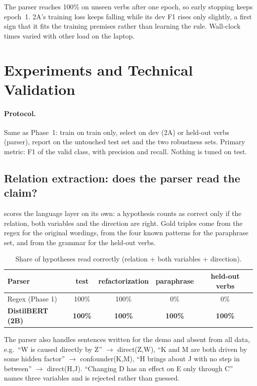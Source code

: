 \documentclass[12pt,a4paper]{article}
\newcommand{\thead}[1]{\textbf{#1}}
\begin{document}
The parser reaches 100\% on unseen verbs after one epoch, so early stopping keeps epoch~1. 2A's training loss keeps
falling while its dev F1 rises only slightly, a first sign that it fits the training premises rather than learning the rule.
Wall-clock times varied with other load on the laptop.

\section{Experiments and Technical Validation}\label{sec:results}

\paragraph{Protocol.} Same as Phase~1: train on train only, select on dev (2A) or held-out verbs (parser), report on the untouched
test set and the two robustness sets. Primary metric: F1 of the valid class, with precision and recall. Nothing is tuned on test.

\subsection{Relation extraction: does the parser read the claim?}
 scores the language layer on its own: a hypothesis counts as correct only if the relation, both variables and the
direction are right. Gold triples come from the regex for the original wordings, from the four known patterns for the paraphrase
set, and from the grammar for the held-out verbs.

\begin{table}[!htbp]
\centering\small
\caption{Share of hypotheses read correctly (relation + both variables + direction).}
\label{tab:parser}
\begin{tabular}{@{}lcccc@{}}
\toprule
\thead{Parser} & \thead{test} & \thead{refactorization} & \thead{paraphrase} & \thead{held-out verbs} \\
\midrule
Regex (Phase 1)       & 100\% & 100\% & 0\% & 0\% \\
\rowcolor{rowtint} \textbf{DistilBERT (2B)} & \textbf{100\%} & \textbf{100\%} & \textbf{100\%} & \textbf{100\%} \\
\bottomrule
\end{tabular}
\end{table}

The parser also handles sentences written for the demo and absent from all data, e.g.\ ``W is caused directly by Z''
$\rightarrow$ direct(Z,W), ``K and M are both driven by some hidden factor'' $\rightarrow$ confounder(K,M), ``H brings about J
with no step in between'' $\rightarrow$ direct(H,J). ``Changing D has an effect on E only through C'' names three variables and is
rejected rather than guessed.
\end{document}
